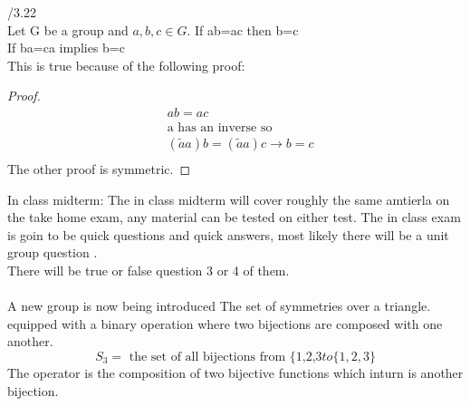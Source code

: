 \documentclass[11pt]{article}
\theoremstyle{definition}  %
\begin{document}
/3.22\\
Let G be a group and $ a,b,c\in G $.
If ab=ac then b=c\\
If ba=ca implies b=c\\
This is true because of the following proof:
\begin{proof}
  \begin{align*}
    &ab=ac\\
    &\text{a has an inverse so}\\
    &(\tilde{a}a)b=(\tilde{a}a)c\rightarrow b=c\\
  \end{align*}
  The other proof is symmetric.
\end{proof}


In class midterm:
The in class midterm will cover roughly the same amtierla on the take home exam, any material can be tested on either test. The in class exam is goin to be quick questions and quick answers, most likely there will be a unit group question . \\
There will be true or false question 3 or 4 of them. \\
\\
A new group is now being introduced
The set of symmetries over a triangle. equipped with a binary operation where two bijections are composed with one another. \\
\[
  S_3=\text{ the set of all bijections from \{1,2,3} to \{1,2,3\}
\]
The operator is the composition of two bijective functions which inturn is another bijection. 
\end{document}
